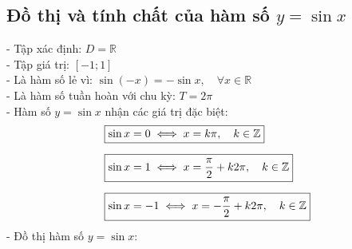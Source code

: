 \subsection{Đồ thị và tính chất của hàm số $y=\sin x$}
\noindent
\hspace*{1cm}
- Tập xác định: $D = \mathbb{R}$\\[6pt]
\hspace*{1cm}
- Tập giá trị: $[-1;1]$\\[6pt]
\hspace*{1cm}
- Là hàm số lẻ vì: $\sin(-x) = -\sin x, \quad \forall x \in \mathbb{R}$\\[6pt]
\hspace*{1cm}
- Là hàm số tuần hoàn với chu kỳ: $T = 2 \pi$\\[6pt]
\hspace*{1cm}
- Hàm số $y = \sin x$ nhận các giá trị đặc biệt:\\[6pt]
\[
    \begin{aligned}
        &\fbox{$\sin x = 0 \iff x = k \pi, \quad k \in \mathbb{Z}$}\\[6pt]
        &\fbox{$\sin x = 1 \iff x = \dfrac{\pi}{2} + k2\pi, \quad k \in \mathbb{Z}$}\\[6pt]
        &\fbox{$\sin x = -1 \iff x = -\dfrac{\pi}{2} + k2\pi, \quad k \in \mathbb{Z}$}
    \end{aligned}
\]
\hspace*{1cm}
- Đồ thị hàm số $y = \sin x$:\\
\begin{center}
    \centering
    
\end{center}

